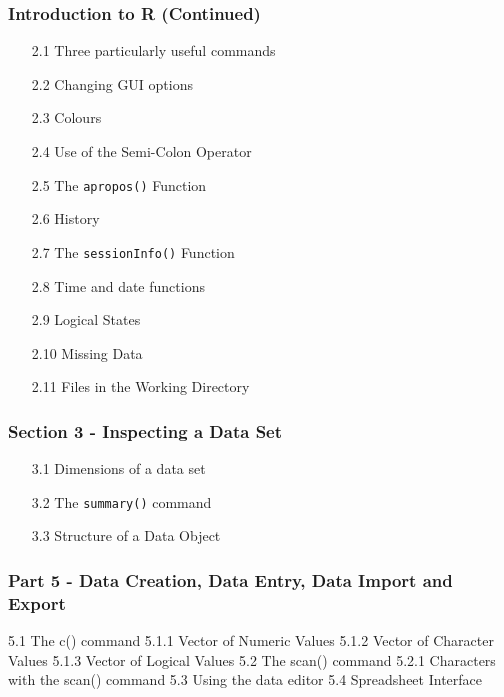 \documentclass{beamer}
\begin{document}
 	\begin{frame}
 		\frametitle{Introduction to R (Continued) }
 		\begin{itemize}
 			\item[2.1] Three particularly useful commands    
 			\item[2.2] Changing GUI options     
 			\item[2.3] Colours      
 			\item[2.4] Use of the Semi-Colon Operator     
 			\item[2.5] The \texttt{apropos()} Function     
 			\item[2.6] History       
 			\item[2.7] The \texttt{sessionInfo()} Function     
 			\item[2.8] Time and date functions     
 			\item[2.9] Logical States      
 			\item[2.10] Missing Data      
 			\item[2.11] Files in the Working Directory     
 		\end{itemize}
 	\end{frame}
 	\begin{frame}[fragile]
 		\frametitle{Section 3 - Inspecting a Data Set }
 		\begin{itemize}
 			\item[3.1] Dimensions of a data set 
 			\item[3.2] The \texttt{summary()} command 		
 			\item[3.3] Structure of a Data Object 
 		\end{itemize}
 	\end{frame}
 	
 	\begin{frame}[fragile]
 		\frametitle{Part 5 - Data Creation, Data Entry, Data Import and Export}
 		\begin{framed}
 			\begin{semiverbatim}
 				5.1 The c() command 
 				5.1.1 Vector of Numeric Values
 				5.1.2 Vector of Character Values
 				5.1.3 Vector of Logical Values 
 				5.2 The scan() command 
 				5.2.1 Characters with the scan() command
 				5.3 Using the data editor
 				5.4 Spreadsheet Interface 
 			\end{semiverbatim}
 		\end{framed}
 		
 	\end{frame}
 	
\end{document}
